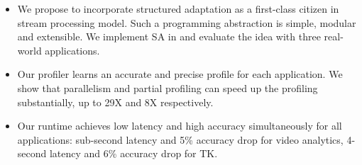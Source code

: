 \begin{itemize}[leftmargin=16pt]

\item We propose to incorporate structured adaptation as a first-class citizen
  in stream processing model. Such a programming abstraction is simple, modular
  and extensible. We implement SA in \sysname{} and evaluate the idea with three
  real-world applications.

\item Our profiler learns an accurate and precise profile for each
  application. We show that parallelism and partial profiling can speed up the
  profiling substantially, up to 29X and 8X respectively.

\item Our runtime achieves low latency and high accuracy simultaneously for all
  applications: sub-second latency and 5\% accuracy drop for video analytics,
  4-second latency and 6\% accuracy drop for TK.

\end{itemize}


